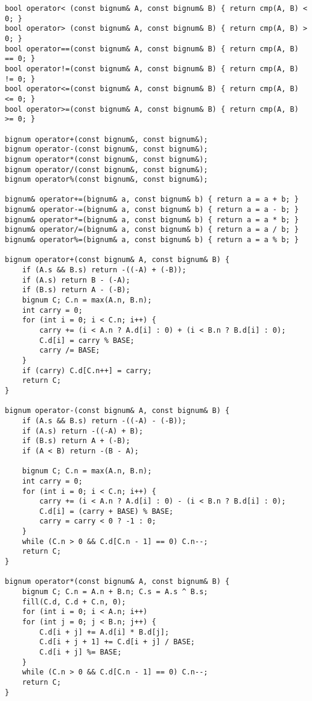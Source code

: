 \begin{verbatim}
bool operator< (const bignum& A, const bignum& B) { return cmp(A, B) <  0; }
bool operator> (const bignum& A, const bignum& B) { return cmp(A, B) >  0; }
bool operator==(const bignum& A, const bignum& B) { return cmp(A, B) == 0; }
bool operator!=(const bignum& A, const bignum& B) { return cmp(A, B) != 0; }
bool operator<=(const bignum& A, const bignum& B) { return cmp(A, B) <= 0; }
bool operator>=(const bignum& A, const bignum& B) { return cmp(A, B) >= 0; }

bignum operator+(const bignum&, const bignum&);
bignum operator-(const bignum&, const bignum&);
bignum operator*(const bignum&, const bignum&);
bignum operator/(const bignum&, const bignum&);
bignum operator%(const bignum&, const bignum&);

bignum& operator+=(bignum& a, const bignum& b) { return a = a + b; }
bignum& operator-=(bignum& a, const bignum& b) { return a = a - b; }
bignum& operator*=(bignum& a, const bignum& b) { return a = a * b; }
bignum& operator/=(bignum& a, const bignum& b) { return a = a / b; }
bignum& operator%=(bignum& a, const bignum& b) { return a = a % b; }

bignum operator+(const bignum& A, const bignum& B) {
    if (A.s && B.s) return -((-A) + (-B));
    if (A.s) return B - (-A);
    if (B.s) return A - (-B);
    bignum C; C.n = max(A.n, B.n);
    int carry = 0;
    for (int i = 0; i < C.n; i++) {
        carry += (i < A.n ? A.d[i] : 0) + (i < B.n ? B.d[i] : 0);
        C.d[i] = carry % BASE;
        carry /= BASE;
    }
    if (carry) C.d[C.n++] = carry;
    return C;
}

bignum operator-(const bignum& A, const bignum& B) {
    if (A.s && B.s) return -((-A) - (-B));
    if (A.s) return -((-A) + B);
    if (B.s) return A + (-B);
    if (A < B) return -(B - A);
    
    bignum C; C.n = max(A.n, B.n);
    int carry = 0;
    for (int i = 0; i < C.n; i++) {
        carry += (i < A.n ? A.d[i] : 0) - (i < B.n ? B.d[i] : 0);
        C.d[i] = (carry + BASE) % BASE;
        carry = carry < 0 ? -1 : 0;
    }
    while (C.n > 0 && C.d[C.n - 1] == 0) C.n--;
    return C;
}

bignum operator*(const bignum& A, const bignum& B) {
    bignum C; C.n = A.n + B.n; C.s = A.s ^ B.s;
    fill(C.d, C.d + C.n, 0);
    for (int i = 0; i < A.n; i++)
    for (int j = 0; j < B.n; j++) {
        C.d[i + j] += A.d[i] * B.d[j];
        C.d[i + j + 1] += C.d[i + j] / BASE;
        C.d[i + j] %= BASE;
    }
    while (C.n > 0 && C.d[C.n - 1] == 0) C.n--;
    return C;
}


\end{verbatim}
